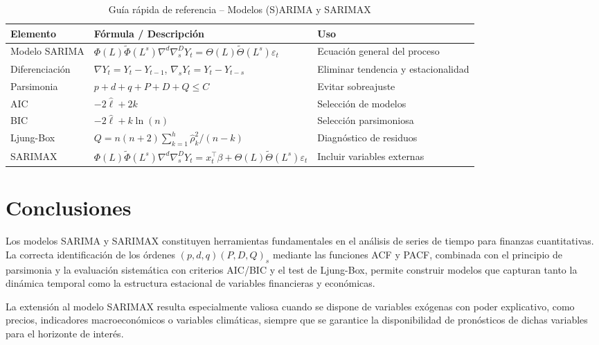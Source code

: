 \documentclass[12pt, a4paper]{article}
\begin{document}
\begin{table}[H]
  \centering
  \caption{Guía rápida de referencia -- Modelos (S)ARIMA y SARIMAX}
  \label{tab:resumen}
  \begin{tabular}{lp{6cm}p{4cm}}
    \toprule
    \textbf{Elemento} & \textbf{Fórmula / Descripción} & \textbf{Uso} \\
    \midrule
    Modelo SARIMA
      & $\Phi(L)\tilde{\Phi}(L^s)\nabla^d\nabla_s^D Y_t = \Theta(L)\tilde{\Theta}(L^s)\varepsilon_t$
      & Ecuación general del proceso \\
    Diferenciación
      & $\nabla Y_t = Y_t - Y_{t-1}$, \; $\nabla_s Y_t = Y_t - Y_{t-s}$
      & Eliminar tendencia y estacionalidad \\
    Parsimonia
      & $p+d+q+P+D+Q \leq C$
      & Evitar sobreajuste \\
    AIC
      & $-2\hat{\ell} + 2k$
      & Selección de modelos \\
    BIC
      & $-2\hat{\ell} + k\ln(n)$
      & Selección parsimoniosa \\
    Ljung-Box
      & $Q = n(n+2)\sum_{k=1}^h \hat{\rho}_k^2/(n-k)$
      & Diagnóstico de residuos \\
    SARIMAX
      & $\Phi(L)\tilde{\Phi}(L^s)\nabla^d\nabla_s^D Y_t = x_t^\top\beta + \Theta(L)\tilde{\Theta}(L^s)\varepsilon_t$
      & Incluir variables externas \\
    \bottomrule
  \end{tabular}
\end{table}

\section{Conclusiones}

Los modelos SARIMA y SARIMAX constituyen herramientas fundamentales en el
análisis de series de tiempo para finanzas cuantitativas. La correcta
identificación de los órdenes $(p,d,q)(P,D,Q)_s$ mediante las funciones ACF y
PACF, combinada con el principio de parsimonia y la evaluación sistemática con
criterios AIC/BIC y el test de Ljung-Box, permite construir modelos que capturan
tanto la dinámica temporal como la estructura estacional de variables financieras
y económicas.

La extensión al modelo SARIMAX resulta especialmente valiosa cuando se dispone
de variables exógenas con poder explicativo, como precios, indicadores
macroeconómicos o variables climáticas, siempre que se garantice la
disponibilidad de pronósticos de dichas variables para el horizonte de interés.
\end{document}
